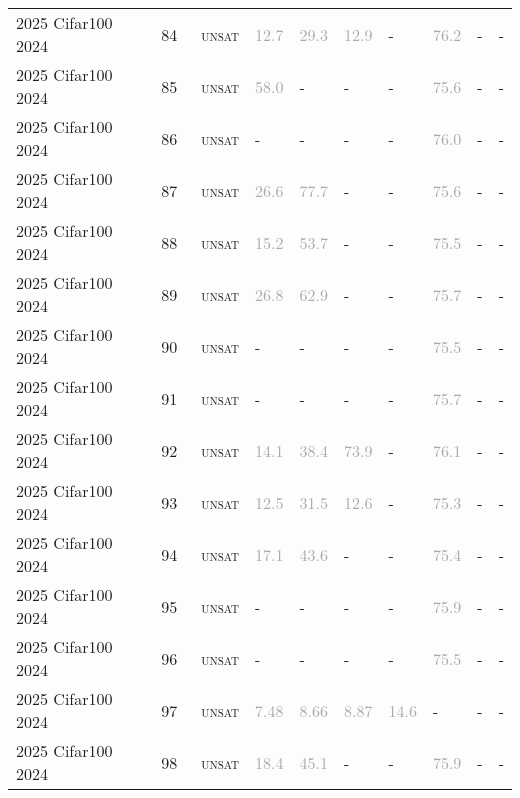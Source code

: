\begin{center}
{\begin{longtable}{@{}llllllllll@{}}
2025 Cifar100 2024 & 84 & ~\textsc{unsat} & \textcolor{darkgray}{12.7} & \textcolor{darkgray}{29.3} & \textcolor{darkgray}{12.9} & - & \textcolor{darkgray}{76.2} & - & - \\
2025 Cifar100 2024 & 85 & ~\textsc{unsat} & \textcolor{darkgray}{58.0} & - & - & - & \textcolor{darkgray}{75.6} & - & - \\
2025 Cifar100 2024 & 86 & ~\textsc{unsat} & - & - & - & - & \textcolor{darkgray}{76.0} & - & - \\
2025 Cifar100 2024 & 87 & ~\textsc{unsat} & \textcolor{darkgray}{26.6} & \textcolor{darkgray}{77.7} & - & - & \textcolor{darkgray}{75.6} & - & - \\
2025 Cifar100 2024 & 88 & ~\textsc{unsat} & \textcolor{darkgray}{15.2} & \textcolor{darkgray}{53.7} & - & - & \textcolor{darkgray}{75.5} & - & - \\
2025 Cifar100 2024 & 89 & ~\textsc{unsat} & \textcolor{darkgray}{26.8} & \textcolor{darkgray}{62.9} & - & - & \textcolor{darkgray}{75.7} & - & - \\
2025 Cifar100 2024 & 90 & ~\textsc{unsat} & - & - & - & - & \textcolor{darkgray}{75.5} & - & - \\
2025 Cifar100 2024 & 91 & ~\textsc{unsat} & - & - & - & - & \textcolor{darkgray}{75.7} & - & - \\
2025 Cifar100 2024 & 92 & ~\textsc{unsat} & \textcolor{darkgray}{14.1} & \textcolor{darkgray}{38.4} & \textcolor{darkgray}{73.9} & - & \textcolor{darkgray}{76.1} & - & - \\
2025 Cifar100 2024 & 93 & ~\textsc{unsat} & \textcolor{darkgray}{12.5} & \textcolor{darkgray}{31.5} & \textcolor{darkgray}{12.6} & - & \textcolor{darkgray}{75.3} & - & - \\
2025 Cifar100 2024 & 94 & ~\textsc{unsat} & \textcolor{darkgray}{17.1} & \textcolor{darkgray}{43.6} & - & - & \textcolor{darkgray}{75.4} & - & - \\
2025 Cifar100 2024 & 95 & ~\textsc{unsat} & - & - & - & - & \textcolor{darkgray}{75.9} & - & - \\
2025 Cifar100 2024 & 96 & ~\textsc{unsat} & - & - & - & - & \textcolor{darkgray}{75.5} & - & - \\
2025 Cifar100 2024 & 97 & ~\textsc{unsat} & \textcolor{darkgray}{7.48} & \textcolor{darkgray}{8.66} & \textcolor{darkgray}{8.87} & \textcolor{darkgray}{14.6} & - & - & - \\
2025 Cifar100 2024 & 98 & ~\textsc{unsat} & \textcolor{darkgray}{18.4} & \textcolor{darkgray}{45.1} & - & - & \textcolor{darkgray}{75.9} & - & - \\

\end{longtable}}
\end{center}
